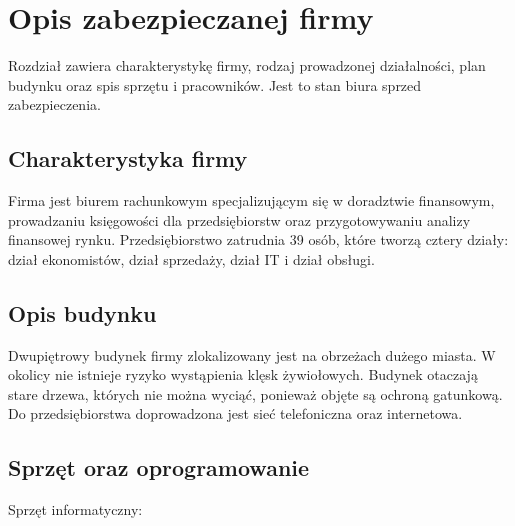 \newpage\section{Opis zabezpieczanej firmy}
Rozdział zawiera charakterystykę firmy, rodzaj prowadzonej działalności, plan budynku oraz spis sprzętu i pracowników. Jest to stan biura sprzed zabezpieczenia.

\subsection{Charakterystyka firmy}
Firma jest biurem rachunkowym specjalizującym się w doradztwie \linebreak finansowym, prowadzaniu księgowości dla przedsiębiorstw oraz przygotowywaniu analizy finansowej rynku. Przedsiębiorstwo zatrudnia 39 osób, które tworzą cztery działy: dział ekonomistów, dział sprzedaży, dział IT i dział obsługi.

\subsection{Opis budynku}
Dwupiętrowy budynek firmy zlokalizowany jest na obrzeżach dużego miasta. W okolicy nie istnieje ryzyko wystąpienia klęsk żywiołowych. \linebreak Budynek otaczają stare drzewa, których nie można wyciąć, ponieważ \linebreak objęte są ochroną gatunkową. Do przedsiębiorstwa doprowadzona jest sieć \linebreak telefoniczna oraz internetowa.

\newpage
\subsection{Sprzęt oraz oprogramowanie}
Sprzęt informatyczny:

